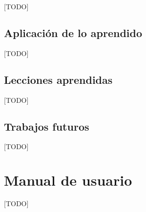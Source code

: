 \documentclass[a4paper, 12pt]{book}
\begin{document}
[TODO]

\section{Aplicación de lo aprendido}
\label{sec:aplicacion}

[TODO]

\section{Lecciones aprendidas}
\label{sec:lecciones_aprendidas}

[TODO]

\section{Trabajos futuros}
\label{sec:trabajos_futuros}

[TODO]



\cleardoublepage
\appendix
\chapter{Manual de usuario}
\label{app:manual}

[TODO]


\cleardoublepage


\end{document}

